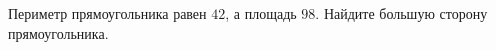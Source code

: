 \begin{ex}
	\begin{condition}
		Периметр прямоугольника равен \( 42 \), а площадь \( 98 \). Найдите большую сторону прямоугольника.
	\end{condition}
\end{ex}
